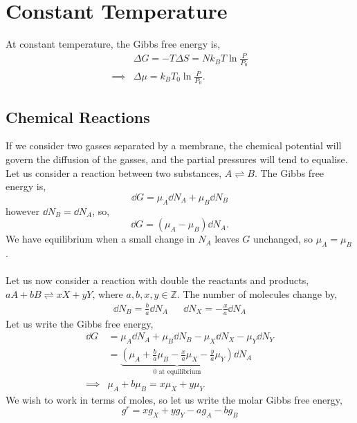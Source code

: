 \documentclass{book}
\begin{document}
\section{Constant Temperature}
At constant temperature, the Gibbs free energy is,
\begin{align}
	&\Delta G = - T \Delta S = Nk_BT\ln\frac{P}{P_0} \\
	\implies & \Delta \mu = k_BT_0 \ln\frac{P}{P_0}.
\end{align}
\subsection{Chemical Reactions}
If we consider two gasses separated by a membrane, the chemical potential will govern the diffusion of the gasses, and the partial pressures will tend to equalise. Let us consider a reaction between two substances, $A \rightleftharpoons B$. The Gibbs free energy is,
\begin{equation}
	\dd{G} = \mu_A\dd{N}_A + \mu_B \dd{N_B}
\end{equation}
however $\dd{N}_B = \dd{N}_A$, so,
\begin{equation}
	\dd{G} = (\mu_A - \mu_B)\dd{N}_A.
\end{equation}
We have equilibrium when a small change in $N_A$ leaves $G$ unchanged, so $\mu_A = \mu_B$.
\\\\
Let us now consider a reaction with double the reactants and products, $aA + bB \rightleftharpoons xX + yY$, where $a,b,x,y \in \mathbb{Z}$. The number of molecules change by,
\begin{align}
	\dd{N}_B = \frac{b}{a}\dd{N}_A && \dd{N}_X = -\frac{x}{a}\dd{N}_A
\end{align}
Let us write the Gibbs free energy,
\begin{equation}
	\begin{split}
		\dd{G} & = \mu_A\dd{N}_A + \mu_B\dd{N}_B - \mu_X\dd{N}_X - \mu_Y\dd{N}_Y \\ 
		& = \underbrace{\left(\mu_A + \frac{b}{a}\mu_B - \frac{x}{a}\mu_X - \frac{y}{a}\mu_Y\right)}_{0\text{ at equilibrium}}\dd{N}_A \\
		\implies & \mu_A+ b\mu_B = x\mu_X + y\mu_Y
	\end{split}
\end{equation}
We wish to work in terms of moles, so let us write the molar Gibbs free energy,
\begin{equation}
	g^r = xg_X + yg_Y - ag_A - bg_B
\end{equation}
\end{document}
